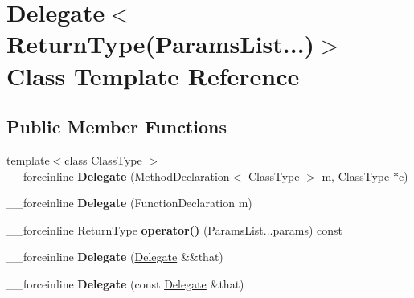 \hypertarget{class_delegate_3_01_return_type_07_params_list_8_8_8_08_4}{}\section{Delegate$<$ Return\+Type(Params\+List...)$>$ Class Template Reference}
\label{class_delegate_3_01_return_type_07_params_list_8_8_8_08_4}
\subsection*{Public Member Functions}
\begin{DoxyCompactItemize}
\item 
\hypertarget{class_delegate_3_01_return_type_07_params_list_8_8_8_08_4_a6247b01aa81337022d8a1bf14e277200}{}{\footnotesize template$<$class Class\+Type $>$ }\\\+\_\+\+\_\+forceinline {\bfseries Delegate} (Method\+Declaration$<$ Class\+Type $>$ m, Class\+Type $\ast$c)\label{class_delegate_3_01_return_type_07_params_list_8_8_8_08_4_a6247b01aa81337022d8a1bf14e277200}

\item 
\hypertarget{class_delegate_3_01_return_type_07_params_list_8_8_8_08_4_a100786735f37a768328229bfbfd996aa}{}\+\_\+\+\_\+forceinline {\bfseries Delegate} (Function\+Declaration m)\label{class_delegate_3_01_return_type_07_params_list_8_8_8_08_4_a100786735f37a768328229bfbfd996aa}

\item 
\hypertarget{class_delegate_3_01_return_type_07_params_list_8_8_8_08_4_a8351bff2e68b1a1518fa24c28cb66c2d}{}\+\_\+\+\_\+forceinline Return\+Type {\bfseries operator()} (Params\+List...\+params) const \label{class_delegate_3_01_return_type_07_params_list_8_8_8_08_4_a8351bff2e68b1a1518fa24c28cb66c2d}

\item 
\hypertarget{class_delegate_3_01_return_type_07_params_list_8_8_8_08_4_a4edbf1fa0cbac540cf40aa8ef286923c}{}\+\_\+\+\_\+forceinline {\bfseries Delegate} (\hyperlink{class_delegate}{Delegate} \&\&that)\label{class_delegate_3_01_return_type_07_params_list_8_8_8_08_4_a4edbf1fa0cbac540cf40aa8ef286923c}

\item 
\hypertarget{class_delegate_3_01_return_type_07_params_list_8_8_8_08_4_a89d1e09e5e696e9b727436bb84894955}{}\+\_\+\+\_\+forceinline {\bfseries Delegate} (const \hyperlink{class_delegate}{Delegate} \&that)\label{class_delegate_3_01_return_type_07_params_list_8_8_8_08_4_a89d1e09e5e696e9b727436bb84894955}


\end{DoxyCompactItemize}
